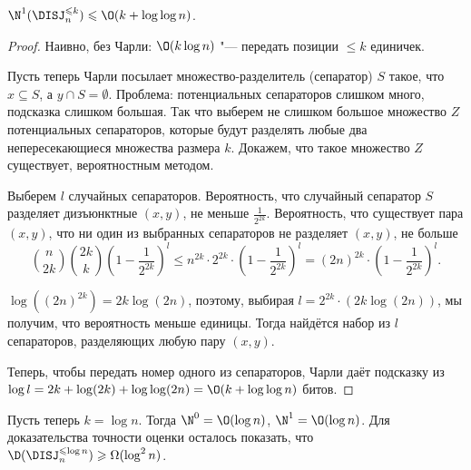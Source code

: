 \begin{theorem}
$\N^1(\DISJ^{\leqslant k}_n)\leqslant \O(k+\log\log n)$.
\end{theorem}
\begin{proof}
Наивно, без Чарли: $\O(k\log n)$ "--- передать позиции $\leqslant k$ единичек.

Пусть теперь Чарли посылает множество-разделитель (сепаратор) $S$ такое, что $x\subseteq S$, а $y\cap S=\emptyset$.
Проблема: потенциальных сепараторов слишком много, подсказка слишком большая. Так что выберем не слишком большое множество $Z$ потенциальных сепараторов, которые будут разделять любые два непересекающиеся множества размера $k$.
Докажем, что такое множество $Z$ существует, вероятностным методом.

Выберем $l$ случайных сепараторов.
Вероятность, что случайный сепаратор $S$ разделяет дизъюнктные $(x, y)$, не меньше $\frac{1}{2^{2k}}$.
Вероятность, что существует пара $(x, y)$, что ни один из выбранных сепараторов не разделяет $(x, y)$, не больше
$$\binom{n}{2k}\binom{2k}{k}\left(1-\frac{1}{2^{2k}}\right)^l \leqslant
n^{2k}\cdot 2^{2k}\cdot \left(1-\frac{1}{2^{2k}}\right)^l =
(2n)^{2k}\cdot \left(1-\frac{1}{2^{2k}}\right)^l.$$

$\log((2n)^{2k}) = 2k\log(2n)$, поэтому, выбирая $l = 2^{2k}\cdot (2k\log(2n))$, мы получим, что вероятность меньше единицы. Тогда найдётся набор из $l$ сепараторов, разделяющих любую пару $(x, y)$.

Теперь, чтобы передать номер одного из сепараторов, Чарли даёт подсказку из $\log l = 2k + \log(2k) + \log\log(2n) = \O(k + \log\log n)$ битов.
\end{proof}

Пусть теперь $k = \log n$. 
Тогда $\N^0 = \O(\log n)$, $\N^1 = \O(\log n)$. Для доказательства точности оценки осталось показать, что $\D(\DISJ_n^{\leqslant \log n})\geqslant \Omega(\log^2 n)$.